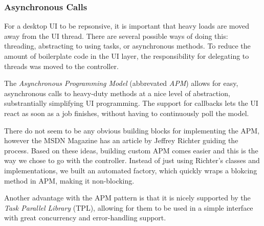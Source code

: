\subsubsection{Asynchronous Calls}


For a desktop UI to be repsonsive, it is important that heavy loads are moved away from the UI thread. There are several possible ways of doing this: threading, abstracting to using tasks, or asynchronous methods. To reduce the amount of boilerplate code in the UI layer, the responsibility for delegating to threads was moved to the controller.

The \emph{Asynchronous Programming Model}\cite{msdnAPMdoc} (abbrevated \emph{APM}) allows for easy, asynchronous calls to heavy-duty methods at a nice level of abstraction, substrantially simplifying UI programming. The support for callbacks lets the UI react as soon as a job finishes, without having to continuously poll the model.

There do not seem to be any obvious building blocks for implementing the APM, however the MSDN Magazine\cite{richtermsdn0307} has an article by Jeffrey Richter guiding the process. Based on these ideas, building custom APM comes easier and this is the way we chose to go with the controller. Instead of just using Richter's classes and implementations, we built an automated factory, which quickly wraps a blokcing method in APM, making it non-blocking.

Another advantage with the APM pattern is that it is nicely supported by the \emph{Task Parallel Library}\cite[p.~656]{Griffiths2010} (TPL), allowing for them to be used in a simple interface with great concurrency and error-handling support.